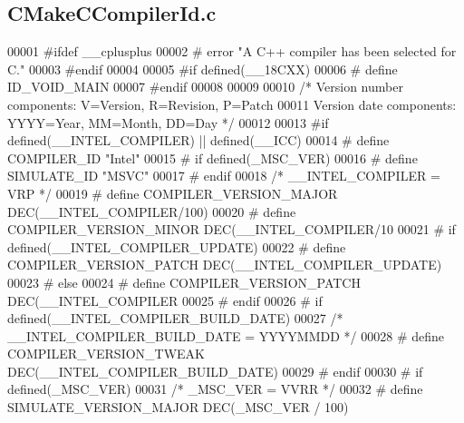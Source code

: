 \subsection{C\+Make\+C\+Compiler\+Id.\+c}
\label{gr-radar-dev_2build_2CMakeFiles_23_85_81_2CompilerIdC_2CMakeCCompilerId_8c_source}

\begin{DoxyCode}
00001 \textcolor{preprocessor}{#ifdef \_\_cplusplus}
00002 \textcolor{preprocessor}{# error "A C++ compiler has been selected for C."}
00003 \textcolor{preprocessor}{#endif}
00004 
00005 \textcolor{preprocessor}{#if defined(\_\_18CXX)}
00006 \textcolor{preprocessor}{# define ID\_VOID\_MAIN}
00007 \textcolor{preprocessor}{#endif}
00008 
00009 
00010 \textcolor{comment}{/* Version number components: V=Version, R=Revision, P=Patch}
00011 \textcolor{comment}{   Version date components:   YYYY=Year, MM=Month,   DD=Day  */}
00012 
00013 \textcolor{preprocessor}{#if defined(\_\_INTEL\_COMPILER) || defined(\_\_ICC)}
00014 \textcolor{preprocessor}{# define COMPILER\_ID "Intel"}
00015 \textcolor{preprocessor}{# if defined(\_MSC\_VER)}
00016 \textcolor{preprocessor}{#  define SIMULATE\_ID "MSVC"}
00017 \textcolor{preprocessor}{# endif}
00018   \textcolor{comment}{/* \_\_INTEL\_COMPILER = VRP */}
00019 \textcolor{preprocessor}{# define COMPILER\_VERSION\_MAJOR DEC(\_\_INTEL\_COMPILER/100)}
00020 \textcolor{preprocessor}{# define COMPILER\_VERSION\_MINOR DEC(\_\_INTEL\_COMPILER/10 %
00021 \textcolor{preprocessor}{# if defined(\_\_INTEL\_COMPILER\_UPDATE)}
00022 \textcolor{preprocessor}{#  define COMPILER\_VERSION\_PATCH DEC(\_\_INTEL\_COMPILER\_UPDATE)}
00023 \textcolor{preprocessor}{# else}
00024 \textcolor{preprocessor}{#  define COMPILER\_VERSION\_PATCH DEC(\_\_INTEL\_COMPILER   %
00025 \textcolor{preprocessor}{# endif}
00026 \textcolor{preprocessor}{# if defined(\_\_INTEL\_COMPILER\_BUILD\_DATE)}
00027   \textcolor{comment}{/* \_\_INTEL\_COMPILER\_BUILD\_DATE = YYYYMMDD */}
00028 \textcolor{preprocessor}{#  define COMPILER\_VERSION\_TWEAK DEC(\_\_INTEL\_COMPILER\_BUILD\_DATE)}
00029 \textcolor{preprocessor}{# endif}
00030 \textcolor{preprocessor}{# if defined(\_MSC\_VER)}
00031    \textcolor{comment}{/* \_MSC\_VER = VVRR */}
00032 \textcolor{preprocessor}{#  define SIMULATE\_VERSION\_MAJOR DEC(\_MSC\_VER / 100)}
}}
\end{DoxyCode}
